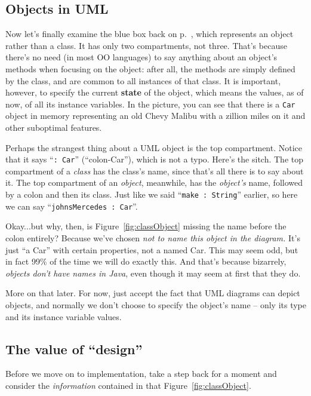 \subsection{Objects in UML}

Now let's finally examine the blue box back on p.~\pageref{fig:classObject}, which
represents an object rather than a class. It has only two compartments, not
three. That's because there's no need (in most OO languages) to say anything
about an object's methods when focusing on the object: after all, the methods
are simply defined by the class, and are common to all instances of that class.
It is important, however, to specify the current \textbf{state} of the object,
which means the values, as of now, of all its instance variables. In the
picture, you can see that there is a \texttt{Car} object in memory representing
an old Chevy Malibu with a zillion miles on it and other suboptimal features.

Perhaps the strangest thing about a UML object is the top compartment. Notice
that it says ``\texttt{:~Car}'' (``colon-Car''), which is not a typo. Here's
the sitch. The top compartment of a \textit{class} has the class's name, since
that's all there is to say about it. The top compartment of an \textit{object},
meanwhile, has the \textit{object's} name, followed by a colon and then its
class. Just like we said ``\texttt{make :~String}'' earlier, so here we can
say ``\texttt{johnsMercedes :~Car}''.

Okay...but why, then, is Figure~\ref{fig:classObject} missing the name before
the colon entirely? Because we've chosen \textit{not to name this object in the
diagram.} It's just ``a Car'' with certain properties, not a named Car. This
may seem odd, but in fact 99\% of the time we will do exactly this. And that's
because bizarrely, \textit{objects don't have names in Java}, even though it
may seem at first that they do.

More on that later. For now, just accept the fact that UML diagrams can depict
objects, and normally we don't choose to specify the object's name -- only its
type and its instance variable values.


\subsection{The value of ``design''}

Before we move on to implementation, take a step back for a moment and
consider the \textit{information} contained in that
Figure~\ref{fig:classObject}.

